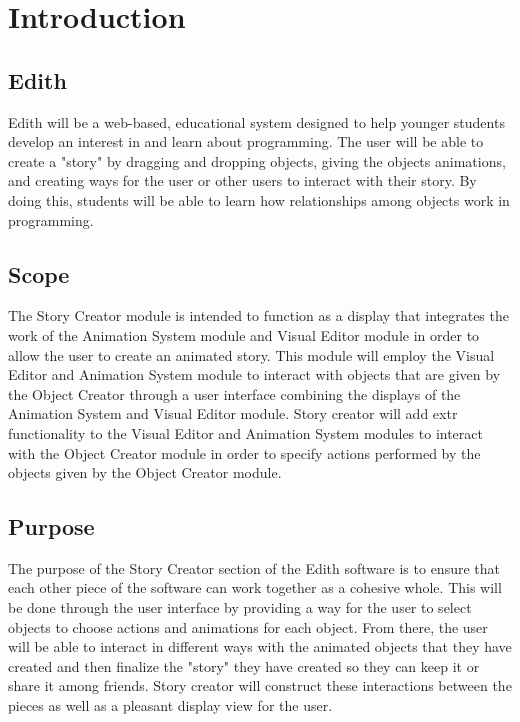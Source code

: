 \documentclass[12pt]{article}
\begin{document}
\section{Introduction}%
	\subsection{Edith}
	Edith will be a web-based, educational system designed to help younger students develop an interest in and learn about programming. The user will be able to create a "story" by dragging and dropping objects, giving the objects animations, and creating ways for the user or other users to interact with their story. By doing this, students will be able to learn how relationships among objects work in programming.
	\subsection{Scope}
	The Story Creator module is intended to function as a display that integrates the work of the Animation System module and Visual Editor module in order to allow the user to create an animated story.  This module will employ the Visual Editor and Animation System module to interact with objects that are given by the Object Creator through a user interface combining the displays of the Animation System and Visual Editor module.  Story creator will add extr functionality to the Visual Editor and Animation System modules to interact with the Object Creator module in order to specify actions performed by the objects given by the Object Creator module.\
	\subsection{Purpose}
	The purpose of the Story Creator section of the Edith software is to ensure that each other piece of the software can work together as a cohesive whole. This will be done through the user interface by providing a way for the user to select objects to choose actions and animations for each object. From there, the user will be able to interact in different ways with the animated objects that they have created and then finalize the "story" they have created so they can keep it or share it among friends. Story creator will construct these interactions between the pieces as well as a pleasant display view for the user.
	
\end{document}
